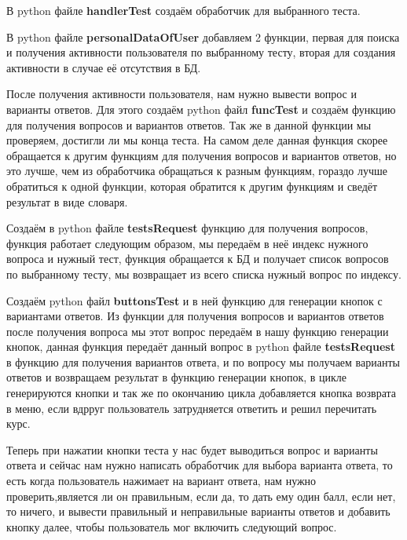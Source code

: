 \documentclass[12pt, oldlfont, amsfonts]{report}
\begin{document}
В python файле {\bf handlerTest} создаём обработчик для выбранного теста.

В python файле {\bf personalDataOfUser} добавляем 2 функции, первая для поиска и получения активности пользователя по выбранному тесту, вторая для создания активности в случае её отсутствия в БД.

После получения активности пользователя, нам нужно вывести вопрос и варианты ответов. Для этого создаём python файл {\bf funcTest} и создаём функцию для получения вопросов и вариантов ответов. Так же в данной функции мы проверяем, достигли ли мы конца теста. На самом деле данная функция скорее обращается к другим функциям для получения вопросов и вариантов ответов, но это лучше, чем из обработчика обращаться к разным функциям, гораздо лучше обратиться к одной функции, которая обратится к другим функциям и сведёт результат в виде словаря. 

Создаём в python файле {\bf testsRequest} функцию для получения вопросов, функция работает следующим образом, мы передаём в неё индекс нужного вопроса и нужный тест, функция обращается к БД и получает список вопросов по выбранному тесту, мы возвращает из всего списка нужный вопрос по индексу. 

Создаём python файл {\bf buttonsTest} и в ней функцию для генерации кнопок с вариантами ответов. Из функции для получения вопросов и вариантов ответов после получения вопроса мы этот вопрос передаём в нашу функцию генерации кнопок, данная функция передаёт данный вопрос в python файле {\bf testsRequest} в функцию для получения вариантов ответа, и по вопросу мы получаем варианты ответов и возвращаем результат в функцию генерации кнопок, в цикле генерируются кнопки и так же по окончанию цикла добавляется кнопка возврата в меню, если вдрруг пользователь затрудняется ответить и решил перечитать курс.

Теперь при нажатии кнопки теста у нас будет выводиться вопрос и варианты ответа и сейчас нам нужно написать обработчик для выбора варианта ответа, то есть когда пользователь нажимает на вариант ответа, нам нужно проверить,является ли он правильным, если да, то дать ему один балл, если нет, то ничего, и вывести правильный и неправильные варианты ответов и добавить кнопку далее, чтобы пользователь мог включить следующий вопрос. 
\end{document}
